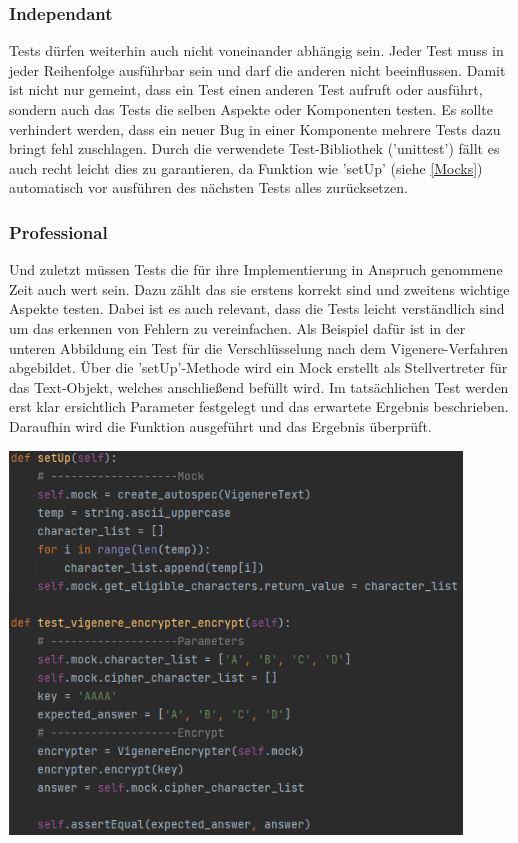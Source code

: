 \documentclass[12pt]{article}
\begin{document}
\subsubsection{Independant}
Tests dürfen weiterhin auch nicht voneinander abhängig sein. Jeder Test muss in jeder Reihenfolge ausführbar sein und darf die anderen nicht beeinflussen. Damit ist nicht nur gemeint, dass ein Test einen anderen Test aufruft oder ausführt, sondern auch das Tests die selben Aspekte oder Komponenten testen. Es sollte verhindert werden, dass ein neuer Bug in einer Komponente mehrere Tests dazu bringt fehl zuschlagen. Durch die verwendete Test-Bibliothek ('unittest') fällt es auch recht leicht dies zu garantieren, da Funktion wie 'setUp' (siehe \ref{Mocks}) automatisch vor ausführen des nächsten Tests alles zurücksetzen.

\subsubsection{Professional}
Und zuletzt müssen Tests die für ihre Implementierung in Anspruch genommene Zeit auch wert sein. Dazu zählt das sie erstens korrekt sind und zweitens wichtige Aspekte testen. Dabei ist es auch relevant, dass die Tests leicht verständlich sind um das erkennen von Fehlern zu vereinfachen. Als Beispiel dafür ist in der unteren Abbildung ein Test für die Verschlüsselung nach dem Vigenere-Verfahren abgebildet. Über die 'setUp'-Methode wird ein Mock erstellt als Stellvertreter für das Text-Objekt, welches anschließend befüllt wird. Im tatsächlichen Test werden erst klar ersichtlich Parameter festgelegt und das erwartete Ergebnis beschrieben. Daraufhin wird die Funktion ausgeführt und das Ergebnis überprüft.
\begin{center}
	\includegraphics[width=12cm]{bilder/Professional.png}
	\label{Professional_pic}
\end{center}

%
\end{document}
